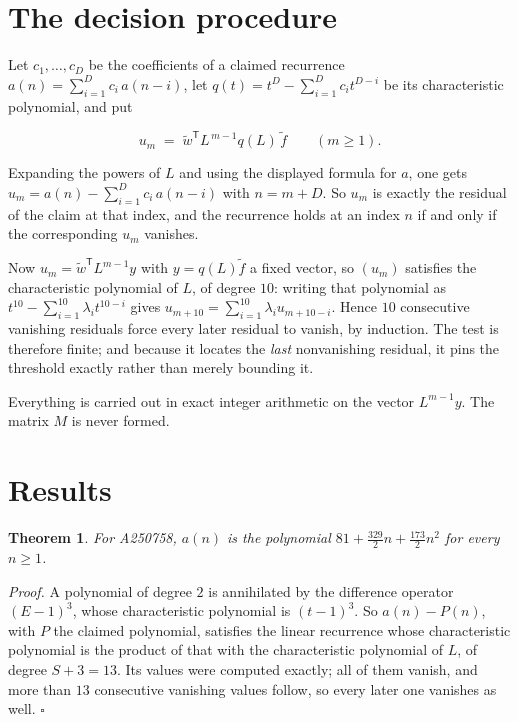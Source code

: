 \documentclass[11pt]{article}
\newtheorem{theorem}{Theorem}
\theoremstyle{definition}
\begin{document}
\section{The decision procedure}

Let $c_1,\dots,c_D$ be the coefficients of a claimed recurrence $a(n) = \sum_{i=1}^{D} c_i\,a(n-i)$, let $q(t) = t^{D} - \sum_{i=1}^{D} c_i t^{D-i}$ be its characteristic polynomial, and put

\[u_m \;=\; \tilde w^{\mathsf T} L^{\,m-1} q(L)\,\tilde f \qquad (m \ge 1).\]

Expanding the powers of $L$ and using the displayed formula for $a$, one gets $u_m = a(n) - \sum_{i=1}^{D} c_i\,a(n-i)$ with $n = m + D$. So $u_m$ is exactly the residual of the claim at that index, and the recurrence holds at an index $n$ if and only if the corresponding $u_m$ vanishes.

Now $u_m = \tilde w^{\mathsf T} L^{m-1} y$ with $y = q(L)\tilde f$ a fixed vector, so $(u_m)$ satisfies the characteristic polynomial of $L$, of degree $10$: writing that polynomial as $t^{10} - \sum_{i=1}^{10} \lambda_i t^{10-i}$ gives $u_{m+10} = \sum_{i=1}^{10} \lambda_i u_{m+10-i}$. Hence $10$ consecutive vanishing residuals force every later residual to vanish, by induction. The test is therefore finite; and because it locates the {\itshape last} nonvanishing residual, it pins the threshold exactly rather than merely bounding it.

Everything is carried out in exact integer arithmetic on the vector $L^{m-1}y$. The matrix $M$ is never formed.

\section{Results}

\begin{theorem} For A250758, $a(n)$ is the polynomial $81 + \frac{329}{2}n + \frac{173}{2}n^{2}$ for every $n \ge 1$.\end{theorem}

{\itshape Proof.} A polynomial of degree $2$ is annihilated by the difference operator $(E-1)^{3}$, whose characteristic polynomial is $(t-1)^{3}$. So $a(n) - P(n)$, with $P$ the claimed polynomial, satisfies the linear recurrence whose characteristic polynomial is the product of that with the characteristic polynomial of $L$, of degree $S + 3 = 13$. Its values were computed exactly; all of them vanish, and more than $13$ consecutive vanishing values follow, so every later one vanishes as well. $\square$
\end{document}
